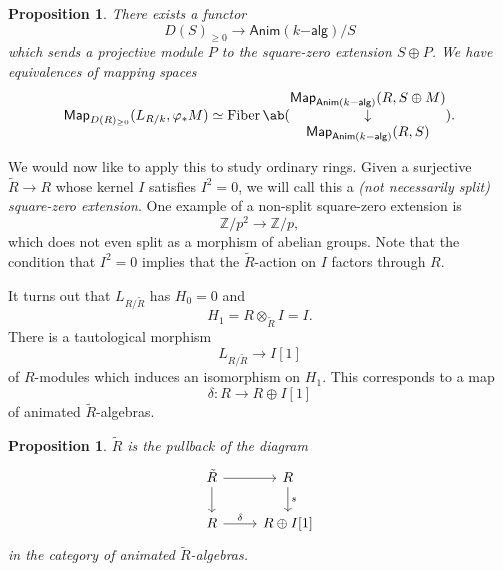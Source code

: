 \documentclass[10pt]{amsart}
\newtheorem{prop}[thm]{Proposition}
\theoremstyle{definition}
\theoremstyle{remark}
\theoremstyle{plain}
\theoremstyle{definition}
\theoremstyle{remark}
\newcommand{\Z}{\mathbb{Z}}
\newcommand{\on}[1]{\operatorname{#1}}
\newcommand{\ms}[1]{\mathsf{#1}}
\newcommand{\1}{\mathbf{1}}
\newcommand{\2}{\mathbf{2}}
\newcommand{\3}{\mathbf{3}}
\begin{document}
\begin{prop}
    There exists a functor
    \[ D(S)_{\geq 0} \to \ms{Anim}(k\ms{-alg})/S \]
    which sends a projective module $P$ to the square-zero extension $S \oplus P$. We have equivalences of mapping spaces
    \[ \ms{Map}_{D(R)_{\geq 0}} (L_{R/k}, \varphi_* M) \simeq \on{Fiber} \ab(\begin{matrix}\ms{Map}_{\ms{Anim}(k\ms{-alg})}(R, S \oplus M) \\ \downarrow \\ \ms{Map}_{\ms{Anim}(k\ms{-alg})}(R,S)\end{matrix}). \]
\end{prop}

We would now like to apply this to study ordinary rings. Given a surjective $\tilde{R} \to R$ whose kernel $I$ satisfies $I^2 = 0$, we will call this a \textit{(not necessarily split) square-zero extension}. One example of a non-split square-zero extension is
\[ \Z/p^2 \to \Z/p, \]
which does not even split as a morphism of abelian groups. Note that the condition that $I^2 = 0$ implies that the $\tilde{R}$-action on $I$ factors through $R$.

It turns out that $L_{R/\tilde{R}}$ has $H_0 = 0$ and 
\[ H_1 = R \otimes_{\tilde{R}} I = I. \]
There is a tautological morphism
\[ L_{R/\tilde{R}} \to I[1] \]
of $R$-modules which induces an isomorphism on $H_1$. This corresponds to a map
\[ \delta \colon R \to R \oplus I[1] \]
of animated $\tilde{R}$-algebras.

\begin{prop}
    $\tilde{R}$ is the pullback of the diagram
    \begin{equation*}
    \begin{tikzcd}
        \tilde{R} \ar{r} \ar{d} & R \ar{d}{s} \\
        R \ar{r}{\delta} & R \oplus I[1]
    \end{tikzcd}
    \end{equation*}
    in the category of animated $\tilde{R}$-algebras.
\end{prop}
\end{document}
